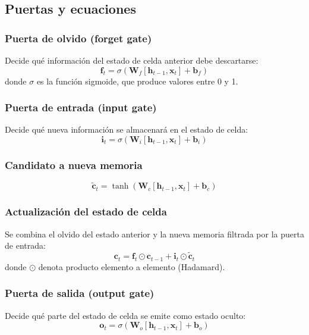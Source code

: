 \documentclass[12pt,a4paper,openany,oneside]{book}
\begin{document}
\subsection{Puertas y ecuaciones}

\subsubsection{Puerta de olvido (forget gate)}
Decide qué información del estado de celda anterior debe descartarse:
\begin{equation}
\mathbf{f}_t = \sigma( \mathbf{W}_f [\mathbf{h}_{t-1}, \mathbf{x}_t] + \mathbf{b}_f )
\end{equation}
donde \(\sigma\) es la función sigmoide, que produce valores entre 0 y 1.

\subsubsection{Puerta de entrada (input gate)}
Decide qué nueva información se almacenará en el estado de celda:
\begin{equation}
\mathbf{i}_t = \sigma( \mathbf{W}_i [\mathbf{h}_{t-1}, \mathbf{x}_t] + \mathbf{b}_i )
\end{equation}

\subsubsection{Candidato a nueva memoria}
\begin{equation}
\tilde{\mathbf{c}}_t = \tanh( \mathbf{W}_c [\mathbf{h}_{t-1}, \mathbf{x}_t] + \mathbf{b}_c )
\end{equation}

\subsubsection{Actualización del estado de celda}
Se combina el olvido del estado anterior y la nueva memoria filtrada por la puerta de entrada:
\begin{equation}
\mathbf{c}_t = \mathbf{f}_t \odot \mathbf{c}_{t-1} + \mathbf{i}_t \odot \tilde{\mathbf{c}}_t
\end{equation}
donde \(\odot\) denota producto elemento a elemento (Hadamard).

\subsubsection{Puerta de salida (output gate)}
Decide qué parte del estado de celda se emite como estado oculto:
\begin{equation}
\mathbf{o}_t = \sigma( \mathbf{W}_o [\mathbf{h}_{t-1}, \mathbf{x}_t] + \mathbf{b}_o )
\end{equation}
\end{document}
